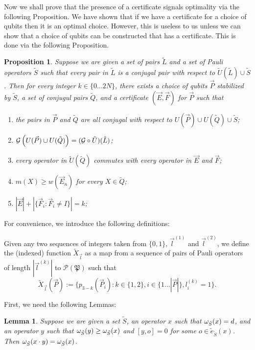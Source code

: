 \documentclass[twocolumn,showpacs,preprintnumbers,amsmath,amssymb,nofootinbib,pra,floatfix]{revtex4-1}
\newtheorem{proposition}{Proposition}
\newtheorem{lemma}{Lemma}
\newenvironment{definition}[1][Definition]{\begin{trivlist}
\item[\hskip \labelsep {\bfseries #1}]}{\end{trivlist}}
\newcommand{\lst}{\vec}
\newcommand{\set}{\tilde}
\newcommand{\genfun}{\mathcal{G}}
\newcommand{\pauligroup}{\mathfrak{P}}
\newcommand{\powerset}{\mathcal{P}}
\begin{document}
Now we shall prove that the presence of a certificate signals optimality via the following Proposition.
We have shown that if we have a certificate for a choice of qubits then it is an optimal choice.  However, this is useless to us unless we can show that a choice of qubits can be constructed that has a certificate.  This is done via the following Proposition.

\begin{proposition}
\label{certificate-creation}
Suppose we are given a set of pairs $\set L$ and a set of Pauli operators $\set S$ such that every pair in $\set L$ is a conjugal pair with respect to $\set U(\set L)\cup\set S$.  Then for every integer $k\in\{0\dots 2N\}$, there exists a choice of qubits $\lst P$ stabilized by $\set S$, a set of conjugul pairs $\set Q$, and a certificate $(\lst E,\lst F)$ for $\lst P$ such that
\begin{enumerate}
\item the pairs in $\lst P$ and $\set Q$ are all conjugal with respect to $U(\lst P)\cup U(\set Q)\cup \set S$;
\item $\genfun\paren{U(\lst P)\cup U(\set Q)}=(\genfun\circ\set U)(\set L)$;
\item every operator in $\set U(\set Q)$ commutes with every operator in $\lst E$ and $\lst F$;
\item $m(X)\ge w(\lst E_n)$ for every $X\in\set Q$;
\item $|\lst E|+|\{\lst F_i : \lst F_i\ne I\}|=k$;
\end{enumerate}
\end{proposition}
For convenience, we introduce the following definitions:

\begin{definition}
Given any two sequences of integers taken from $\{0,1\}$, $\lst l^{(1)}$ and $\lst l^{(2)}$, we define the (indexed) function $\set X_{\lst l}$ as a map from a sequence of pairs of Pauli operators of length $|\lst l^{(k)}|$ to $\powerset(\pauligroup)$ such that
$$\set X_{\lst l}(\lst P) := \{p_{3-k}(\lst P_i) : k \in \{1,2\}, i \in \{1\dots |\lst P|\}, l^{(k)}_i=1\}.$$
\end{definition}
First, we need the following Lemmas:
\begin{lemma}
\label{unchanged-error-weight}
Suppose we are given a set $\set S$, an operator $x$ such that $\om_{\set S}(x)=d$, and an operator $y$ such that $\om_{\set S}(y) \ge \om_{\set S}(x)$ and $[y,o]=0$ for some $o\in\set e_{\set S}(x)$.  Then $\om_{\set S}(x\cdot y)=\om_{\set S}(x)$.
\end{lemma}
\end{document}
